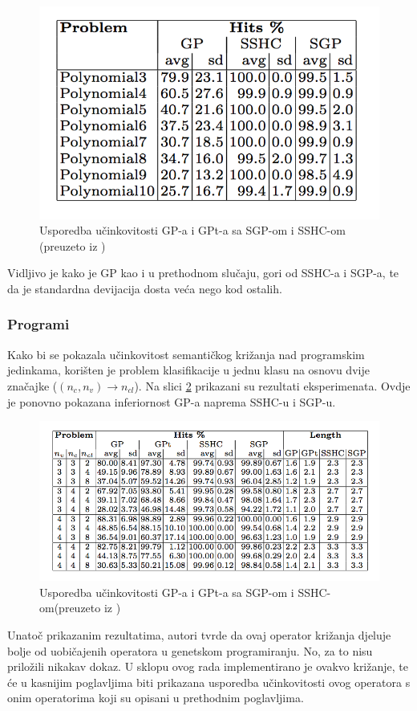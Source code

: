  \begin{figure}[H]
	\centering
	\includegraphics[scale=0.4]{./slike/semSymbTable.png}
	\caption{Usporedba učinkovitosti GP-a i GPt-a sa SGP-om i SSHC-om (preuzeto iz \cite{crxSem})}
	\label{semSymbTable}
\end{figure}

Vidljivo je kako je GP kao i u prethodnom slučaju, gori od SSHC-a i SGP-a, te da je standardna devijacija dosta veća nego kod ostalih.

\subsubsection{Programi}

Kako bi se pokazala učinkovitost semantičkog križanja nad programskim jedinkama, korišten je problem klasifikacije u jednu klasu na osnovu dvije značajke ($(n_c, n_v) \to n_ {cl}$). Na slici \ref{semProg} prikazani su rezultati eksperimenata. Ovdje je ponovno pokazana inferiornost GP-a naprema SSHC-u i SGP-u.

 \begin{figure}[H]
	\centering
	\includegraphics[scale=0.5]{./slike/semProg.png}
	\caption{Usporedba učinkovitosti GP-a i GPt-a sa SGP-om i SSHC-om(preuzeto iz \cite{crxSem})}
	\label{semProg}
\end{figure}

Unatoč prikazanim rezultatima, autori \cite{crxSem} tvrde da ovaj operator križanja djeluje bolje od uobičajenih operatora u genetskom programiranju. No, za to nisu priložili nikakav dokaz. U sklopu ovog rada implementirano je ovakvo križanje, te će u kasnijim poglavljima biti prikazana usporedba učinkovitosti ovog operatora s onim operatorima koji su opisani u prethodnim poglavljima.